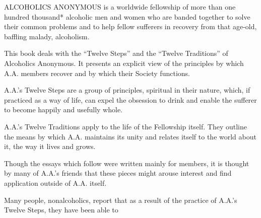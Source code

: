 

\begin{biblechapter}

ALCOHOLICS ANONYMOUS is a worldwide fellowship 
of more than one hundred thousand* alcoholic men and women 
who are banded together to solve their common problems 
and to help fellow sufferers in recovery from
that age-old, baffling malady, alcoholism.

This  book deals  with  the “Twelve Steps” 
and the “Twelve Traditions” of Alcoholics Anonymous.
It presents an explicit view of the principles by which A.A. members recover 
and by which their Society functions.

A.A.'s Twelve Steps are a group of principles, spiritual in their nature, 
which, if practiced as a way of life, can expel the obsession to drink 
and enable the sufferer to become happily and usefully whole.

A.A.'s Twelve Traditions apply to the life of the Fellowship itself. 
They outline the means by which A.A. maintains its unity 
and relates itself to the world about it, 
the way it lives and grows.

Though the essays which follow were written mainly for members, 
it is thought by many of A.A.'s friends that these pieces 
might arouse interest and find application outside of A.A. itself.

Many people, nonalcoholics, report that as a result of the practice of A.A.'s Twelve Steps, 
they have been able to

\end{biblechapter}

